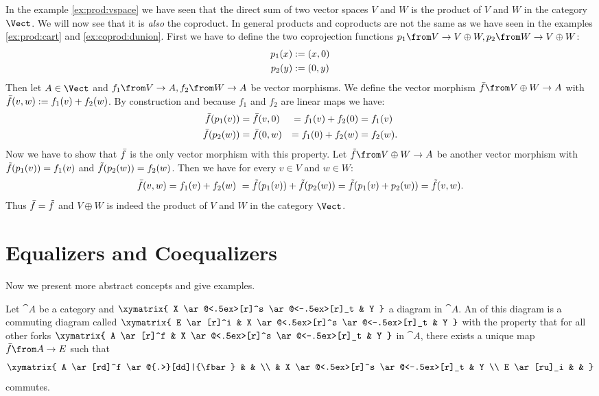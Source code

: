 \begin{example}
  \label{ex:coprod:vspace}
  In the example \ref{ex:prod:vspace} we have seen that the direct sum of two vector spaces $V$ and $W$ is the product of $V$ and $W$ in the category $\Vect$.
  We will now see that it is \emph{also} the coproduct.
  In general products and coproducts are not the same as we have seen in the examples \ref{ex:prod:cart} and \ref{ex:coprod:dunion}.
  First we have to define the two coprojection functions $p_1 \from V \to V \oplus W, p_2 \from W \to V \oplus W$:
  \begin{alignat*}{2}
    p_1(x) &:= \left( x , 0 \right) \\
    p_2(y) &:= \left( 0 , y \right)
  \end{alignat*}
  Then let $A \in \Vect$ and $f_1 \from V \to A, f_2 \from W \to A$ be vector morphisms.
  We define the vector morphism $\fbar \from V \oplus W \to A$ with $\bar{f}(v, w) := f_1(v) + f_2(w)$.
  By construction and because $f_1$ and $f_2$ are linear maps we have:
  \begin{alignat*}{4}
    \bar{f}(p_1(v)) &= \bar{f}(v, 0) &= f_1(v) + f_2(0) &= f_1(v) \\
    \bar{f}(p_2(w)) &= \bar{f}(0, w) &= f_1(0) + f_2(w) &= f_2(w).
  \end{alignat*}
  Now we have to show that $\bar{f}$ is the only vector morphism with this property.
  Let $\ftilde \from V \oplus W \to A$ be another vector morphism with $\tilde{f}(p_1(v)) = f_1(v)$ and $\tilde{f}(p_2(w)) = f_2(w)$.
  Then we have for every $v \in V$ and $w \in W$:
  $$ \bar{f}(v,w) = f_1(v) + f_2(w)\ = \tilde{f}(p_1(v)) + \tilde{f}(p_2(w)) = \tilde{f}(p_1(v) + p_2(w)) = \tilde{f}(v, w). $$
  Thus $\bar{f} = \tilde{f}$ and $V \oplus W$ is indeed the product of $V$ and $W$ in the category $\Vect$.
\end{example}

\section*{Equalizers and Coequalizers}

Now we present more abstract concepts and give examples.

\begin{definition}[Equalizer]
  \label{def:equa}
  Let $\cat{A}$ be a category and
  $ \xymatrix{
    X \ar@<.5ex>[r]^s \ar@<-.5ex>[r]_t & Y
  } $
  a diagram in $\cat{A}$.
  An  of this diagram is a commuting diagram called 
  $ \xymatrix{
    E \ar[r]^i & X \ar@<.5ex>[r]^s \ar@<-.5ex>[r]_t & Y
  } $
  with the property that for all other forks
  $ \xymatrix{
    A \ar[r]^f & X \ar@<.5ex>[r]^s \ar@<-.5ex>[r]_t & Y
  } $
  in $\cat{A}$, there exists a unique map $\fbar\from A \to E$ such that
  \[ \xymatrix{
    A \ar[rd]^f \ar@{.>}[dd]|{\fbar} & & \\
    & X \ar@<.5ex>[r]^s \ar@<-.5ex>[r]_t & Y \\
    E \ar[ru]_i & &
  } \]
  commutes.
\end{definition}

